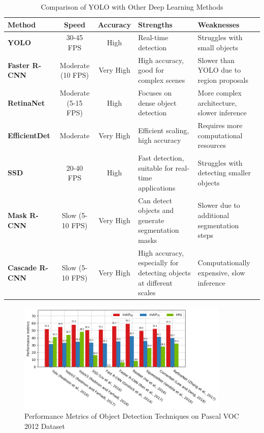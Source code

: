 \begin{table}[H]
\centering
\caption{Comparison of YOLO with Other Deep Learning Methods}
\vspace{0.3cm} 
\begin{tabular}{|l|c|c|p{3.5cm}|p{3.5cm}|}
\hline
\textbf{Method}       & \textbf{Speed}         & \textbf{Accuracy} & \textbf{Strengths}                       & \textbf{Weaknesses}                          \\ \hline
\textbf{YOLO}         & 30-45 FPS              & High              & Real-time detection                      & Struggles with small objects                 \\ \hline
\textbf{Faster R-CNN} & Moderate (10 FPS)      & Very High         & High accuracy, good for complex scenes   & Slower than YOLO due to region proposals     \\ \hline
\textbf{RetinaNet}    & Moderate (5-15 FPS)    & High              & Focuses on dense object detection        & More complex architecture, slower inference  \\ \hline
\textbf{EfficientDet} & Moderate               & Very High         & Efficient scaling, high accuracy         & Requires more computational resources        \\ \hline
\textbf{SSD}          & 20-40 FPS              & High              & Fast detection, suitable for real-time applications & Struggles with detecting smaller objects     \\ \hline
\textbf{Mask R-CNN}   & Slow (5-10 FPS)        & Very High         & Can detect objects and generate segmentation masks & Slower due to additional segmentation steps  \\ \hline
\textbf{Cascade R-CNN}& Slow (5-10 FPS)        & Very High         & High accuracy, especially for detecting objects at different scales & Computationally expensive, slow inference    \\ \hline
\end{tabular}
\label{tab:yolo_vs_other_methods}
\end{table}
%
% 
\begin{figure}[H]
    \centering
    \includegraphics[width=0.9\textwidth]{images/Yolo vs Other Models.png}
    \caption{Performance Metrics of Object Detection Techniques on Pascal VOC 2012 Dataset}
    \label{fig:performance_metrics}
\end{figure}
%
